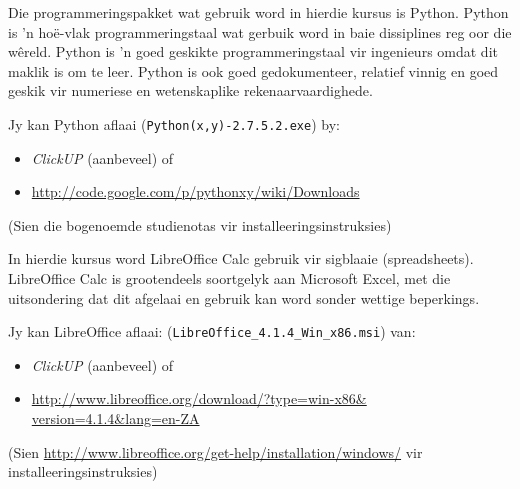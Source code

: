 	Die programmeringspakket wat gebruik word in hierdie kursus is Python.
	Python is 'n ho\"{e}-vlak programmeringstaal wat gerbuik word in baie
	dissiplines reg oor die w\^{e}reld. Python is 'n goed geskikte programmeringstaal 
	vir ingenieurs omdat dit maklik is om te leer.
	Python is ook goed gedokumenteer, relatief vinnig en goed geskik vir numeriese 
	en wetenskaplike rekenaarvaardighede.
        
        Jy kan Python aflaai ({\tt Python(x,y)-2.7.5.2.exe}) by:
        \begin{itemize}
            \item \textit{ClickUP} (aanbeveel) of
            \item \url{http://code.google.com/p/pythonxy/wiki/Downloads}
        \end{itemize}
        (Sien die bogenoemde studienotas vir installeeringsinstruksies)

	In hierdie kursus word LibreOffice Calc gebruik vir sigblaaie (spreadsheets).
	LibreOffice Calc is grootendeels soortgelyk aan Microsoft Excel, met die
	uitsondering dat dit afgelaai en gebruik kan word sonder wettige
	beperkings.
        
        Jy kan LibreOffice aflaai:
        ({\tt  LibreOffice\_4.1.4\_Win\_x86.msi}) van:
        \begin{itemize}
            \item \textit{ClickUP} (aanbeveel) of
            \item \url{http://www.libreoffice.org/download/?type=win-x86&
                       version=4.1.4&lang=en-ZA}
        \end{itemize}
        (Sien \url{http://www.libreoffice.org/get-help/installation/windows/} vir 
        installeeringsinstruksies)
